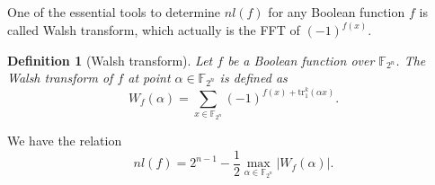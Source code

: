 \documentclass[8pt,oneside]{article}
\newcommand{\0}{\textbf{0}}
\newcommand{\1}{\textbf{1}}
\newcommand{\tr}{\mathrm{tr}_1^k}
\newcommand{\F}{\mathbb{F}}
\newtheorem{definition}{Definition}
\begin{document}
    One of the essential tools to determine $ nl(f) $ for any Boolean function $ f $ is called Walsh transform, which actually is the FFT of $ (-1)^{f(x)} $. 
    \begin{definition}[Walsh transform]
        Let $ f $ be a Boolean function over $ \F_{2^n} $. The Walsh transform of $ f $ at point $ \alpha\in\F_{2^n} $ is defined as 
        \[W_f(\alpha)=\sum_{x\in\F_{2^n}}(-1)^{f(x)+\tr(\alpha x)}.\]
    \end{definition}
    
    We have the relation 
    \[nl(f)=2^{n-1}-\frac{1}{2}\max_{\alpha\in\F_{2^n}}\left\lvert W_f(\alpha)\right\rvert. \]    


\end{document}
